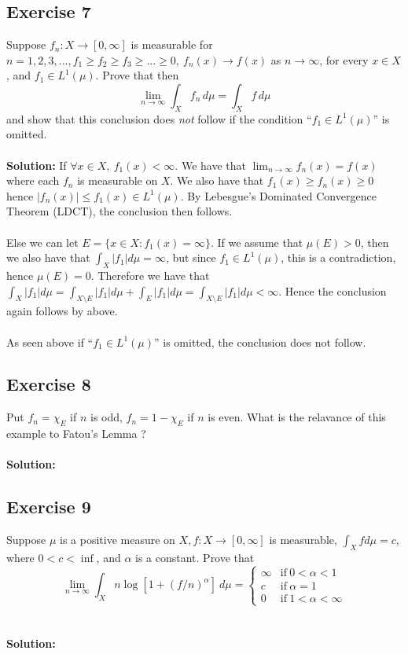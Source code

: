 \documentclass{article}
\begin{document}
\subsection*{Exercise 7}
Suppose $f_n:X \to [0, \infty]$ is measurable for $n=1,2,3,..., f_1 \ge f_2 \ge f_3 \ge ... \ge 0, \ f_n(x) \to f(x)$ as $n \to \infty$,
for every $x \in X$, and $f_1 \in L^1(\mu)$. Prove that then
\[ \lim_{n\to\infty} \int_X f_n \,d\mu = \int_X f \,d\mu \]
and show that this conclusion does \textit{not} follow if the condition ``$ f_1 \in L^1(\mu)$'' is omitted.
\\\\
\textbf{Solution:}
If $\forall x \in X, \ f_1(x) < \infty $.
We have that $\lim_{n\to\infty}f_n(x) = f(x)$ where each $f_n$ is measurable on $X$. We also have that $f_1(x) \ge f_n(x) \ge 0$ hence $|f_n(x)| \le f_1(x) \in L^1(\mu)$.
By Lebesgue's Dominated Convergence Theorem (LDCT), the conclusion then follows.
\\\\ 
Else we can let $E = \{ x \in X : f_1(x) = \infty\}$. If we assume that $\mu(E) > 0$, then we also have that $\int_X|f_1|d\mu = \infty$, but since $f_1 \in L^1(\mu)$, this is
a contradiction, hence $\mu(E) = 0$. Therefore we have that $\int_X|f_1|d\mu = \int_{X\setminus E}|f_1|d\mu + \int_E|f_1|d\mu = \int_{X\setminus E}|f_1|d\mu < \infty$.
Hence the conclusion again follows by above.
\\\\
As seen above if ``$f_1\in L^1(\mu)$'' is omitted, the conclusion does not follow.  

\subsection*{Exercise 8}
Put $f_n = \chi_E$ if $n$ is odd, $f_n=1-\chi_E$ if $n$ is even. What is the relavance of this example to Fatou's Lemma ?
\\\\
\textbf{Solution:}

\subsection*{Exercise 9}
Suppose $\mu$ is a positive measure on $X, f: X \to [0,\infty]$ is measurable, $\int_X f d\mu = c$, where $0<c<\inf$,
and $\alpha$ is a constant. Prove that
\[ \lim_{n\to\infty} \int_X n \log [1+(f/n)^\alpha]\ d\mu = 
    \begin{cases} 
        \infty & \text{if} \ 0<\alpha<1\\
        c & \text{if} \ \alpha = 1\\
        0 & \text{if} \ 1<\alpha<\infty
    \end{cases}
\]
\\\\
\textbf{Solution:}
\end{document}
